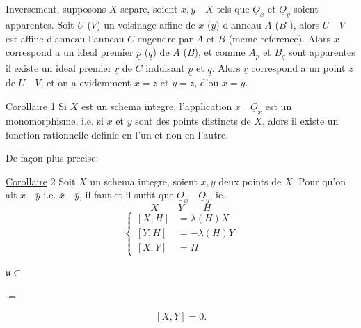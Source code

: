 Inversement, supposons $X$ separe, soient $x,y\quad X$ tels que $\underline O_x$ et $\underline O_y$ soient apparentes. Soit $U$ ($V$) un voisinage affine de $x$ ($y$) d'anneau $A$ ($B$ ), alors $U\quad V$ est affine d'anneau l'anneau $C$ engendre par $A$ et $B$ (meme reference).  Alors $x$ correspond a un ideal premier $\underline p$ ($\underline q$) de $A$ ($B$), et comme  $A_{\underline p}$ et $B_{\underline q}$ sont apparentes il existe un ideal premier $\underline r$ de $C$ induisant $\underline p$ et $\underline q$. Alors $\underline r$ correspond a un point $z$ de $U\quad V$, et on a evidemment $x=z$ et $y=z$, d'ou $x=y$.

\uline{Corollaire} 1 Si $X$ est un schema integre, l'application $x\quad\underline O_x$ est un monomorphisme, i.e. si $x$ et $y$ sont des points distincts de $X$, alors il existe un fonction rationnelle definie en l'un et non en l'autre.

De façon plus precise:

\uline{Corollaire} 2 Soit $X$ un schema integre, soient $x,y$ deux points de $X$. Pour qu'on ait $x\quad\bar y$ i.e. $\bar x\quad\bar y$, il faut et il suffit que $\underline O_x\quad\underline O_y$, ie.
\[
X\qquad Y\qquad H
\]
\[
\left\{\begin{aligned}
[X,H]&=\lambda(H)X\\
[Y,H]&=-\lambda(H)Y\\
[X,Y]&=H
\end{aligned}\right.
\]

\deleted{$[X,H]$}\qquad $\mathfrak u\subset$


   $=$ 

\[
[X,Y]=0.
\]

